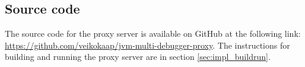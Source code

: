 \documentclass[..thesis.tex]{subfiles}
\begin{document}
\subsection{Source code}

The source code for the proxy server is available on GitHub at the following link: \url{https://github.com/veikokaap/jvm-multi-debugger-proxy}.
The instructions for building and running the proxy server are in section \ref{sec:impl_buildrun}.
\end{document}
